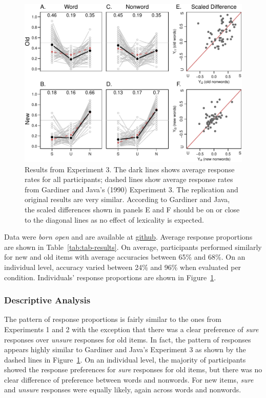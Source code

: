 \documentclass[english,,man,floatsintext]{apa6}
\begin{document}
\begin{figure}
\centering
\includegraphics{p_files/figure-latex/results-3-1.pdf}
\caption{\label{fig:results-3}Results from Experiment 3. The dark lines shows average response rates for all participants; dashed lines show average response rates from Gardiner and Java's (1990) Experiment 3. The replication and original results are very similar. According to Gardiner and Java, the scaled differences shown in panels E and F should be on or close to the diagonal lines as no effect of lexicality is expected.}
\end{figure}

Data were \emph{born open} and are available at \href{https://github.com/PerceptionCognitionLab/data1/tree/master/repGardinerJava/exp2/RKN_replication/RKN_exp2/SU}{github}.
Average response proportions are shown in Table~\ref{tab:tab-results}. On average, participants performed similarly for new and old items with average accuracies between 65\% and 68\%. On an individual level, accuracy varied between 24\% and 96\% when evaluated per condition. Individuals' response proportions are shown in Figure~\ref{fig:results-3}.

\hypertarget{descriptive-analysis-2}{%
\subsubsection{Descriptive Analysis}\label{descriptive-analysis-2}}

The pattern of response proportions is fairly similar to the ones from Experiments 1 and 2 with the exception that there was a clear preference of \emph{sure} responses over \emph{unsure} responses for old items. In fact, the pattern of responses appears highly similar to Gardiner and Java's Experiment 3 as shown by the dashed lines in Figure~\ref{fig:results-3}. On an individual level, the majority of participants showed the response preferences for \emph{sure} responses for old items, but there was no clear difference of preference between words and nonwords. For new items, \emph{sure} and \emph{unsure} responses were equally likely, again across words and nonwords.
\end{document}
